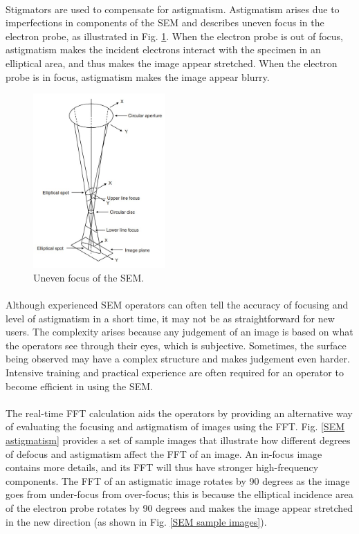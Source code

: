 \documentclass[12pt, twocolumn]{report}
\begin{document}
\paragraph{}
Stigmators are used to compensate for astigmatism. Astigmatism arises due to imperfections in components of the SEM and describes uneven focus in the electron probe, as illustrated in Fig. \ref{SEM uneven focus}. When the electron probe is out of focus, astigmatism makes the incident electrons interact with the specimen in an elliptical area, and thus makes the image appear stretched. When the electron probe is in focus, astigmatism makes the image appear blurry.

\begin{figure}[htbp]
    \centering
    \includegraphics[width=0.45\textwidth]{Figures/SEM uneven focus.jpg}
    \caption{Uneven focus of the SEM.}
    \label{SEM uneven focus}
\end{figure}

\paragraph{}
Although experienced SEM operators can often tell the accuracy of focusing and level of astigmatism in a short time, it may not be as straightforward for new users. The complexity arises because any judgement of an image is based on what the operators see through their eyes, which is subjective. Sometimes, the surface being observed may have a complex structure and makes judgement even harder. Intensive training and practical experience are often required for an operator to become efficient in using the SEM.

\paragraph{}
The real-time FFT calculation aids the operators by providing an alternative way of evaluating the focusing and astigmatism of images using the FFT. Fig. \ref{SEM astigmatism} provides a set of sample images that illustrate how different degrees of defocus and astigmatism affect the FFT of an image. An in-focus image contains more details, and its FFT will thus have stronger high-frequency components. The FFT of an astigmatic image rotates by 90 degrees as the image goes from under-focus from over-focus; this is because the elliptical incidence area of the electron probe rotates by 90 degrees and makes the image appear stretched in the new direction (as shown in Fig. \ref{SEM sample images}).
\end{document}
